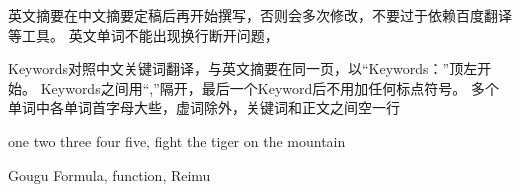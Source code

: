 \abstracten

英文摘要在中文摘要定稿后再开始撰写，否则会多次修改，不要过于依赖百度翻译等工具。
英文单词不能出现换行断开问题，

Keywords对照中文关键词翻译，与英文摘要在同一页，以“Keywords：”顶左开始。
Keywords之间用“,”隔开，最后一个Keyword后不用加任何标点符号。  
多个单词中各单词首字母大些，虚词除外，关键词和正文之间空一行

one two three four five, fight the tiger on the mountain

\vspace{5pt}


\keywordsen Gougu Formula, function, Reimu